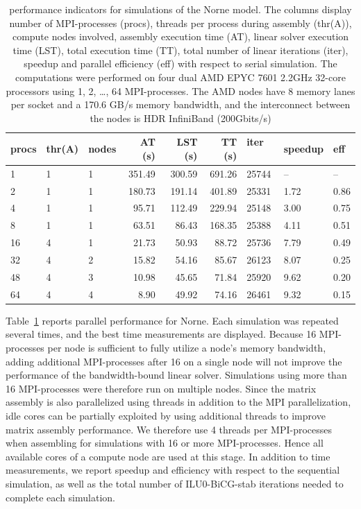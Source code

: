 \begin{table}
  \center
  \caption{\opmflow performance indicators for simulations of the Norne model. The columns
    display number of MPI-processes (procs), threads per process
    during assembly (thr(A)), compute nodes involved,  assembly execution
    time (AT), linear solver execution time (LST), total execution time (TT), total number
    of linear iterations (iter), speedup and parallel efficiency (eff) with respect to
    serial simulation. The computations were performed on four dual AMD EPYC 7601
    2.2GHz 32-core processors using 1, 2, \dots, 64 MPI-processes. The AMD nodes have 8
    memory lanes per socket and a 170.6 GB/s memory bandwidth, and the interconnect
    between the nodes is HDR InfiniBand (200Gbits/s)}\label{tab:NorneScale1}
  \small\medskip
\begin{tabular}{ lll | rrrlll}
  \hline
  procs & thr(A) & nodes & AT (s) &  LST (s) &  TT (s) &   iter $\quad$ &  speedup &       eff \\
  \hline
  1  & 1 & 1 & 351.49 &   300.59 &  691.26 &  25744 &       -- &        -- \\
2  & 1 & 1 & 180.73 &   191.14 &  401.89 &  25331 &  1.72 &  0.86 \\
4  & 1 & 1 &  95.71 &   112.49 &  229.94 &  25148 &  3.00 &   0.75 \\
8  & 1 & 1 &  63.51 &    86.43 &  168.35 &  25388 &  4.11 &  0.51 \\
16 & 4 & 1 &  21.73 &    50.93 &   88.72 &  25736 &  7.79&  0.49 \\
32 & 4 & 2 &  15.82 &    54.16 &   85.67 &  26123 &  8.07 &  0.25 \\
48 & 4 & 3 & 10.98 &    45.65 &   71.84 &  25920 &  9.62 &   0.20 \\
64 & 4 & 4 &   8.90 &    49.92 &   74.16 &  26461 &  9.32 &  0.15 \\
\hline
\end{tabular}
\end{table}

Table~\ref{tab:NorneScale1} reports parallel performance for Norne. Each simulation was
repeated several times, and the best time measurements are displayed. Because 16
MPI-processes per node is sufficient to fully utilize a node's memory bandwidth, adding
additional MPI-processes after 16 on a single node will not improve the performance of the
bandwidth-bound linear solver. Simulations using more than 16 MPI-processes were therefore
run on multiple nodes. Since the matrix assembly is also parallelized
using threads in addition to the MPI parallelization, idle cores can be partially exploited by using
additional threads to improve matrix assembly performance. We therefore use 4 threads per
MPI-processes when assembling for simulations with
16 or more MPI-processes. Hence all available cores of a compute node
are used at this stage. In addition to time measurements, we report speedup and efficiency
with respect to the sequential simulation, as well as the total number of ILU0-BiCG-stab
iterations needed to complete each simulation.

